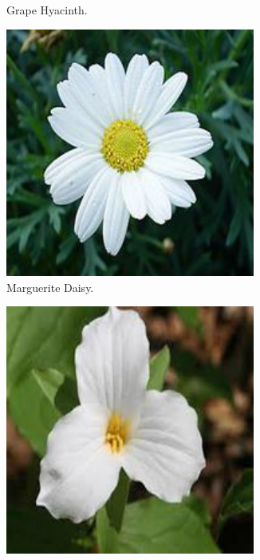 \begin{figure}
\begin{subfigure}{0.24\textwidth}
        \caption{Grape Hyacinth.}
    \end{subfigure}
    \begin{subfigure}{0.24\textwidth}
        \centering
        \includegraphics[width=0.9\textwidth]{../example_images/MargueriteDaisy.jpg}
        \caption{Marguerite Daisy.}
    \end{subfigure}
    \begin{subfigure}{0.24\textwidth}
        \centering
        \includegraphics[width=0.9\textwidth]{../example_images/Trillium.jpg}

\end{subfigure}
\end{figure}
